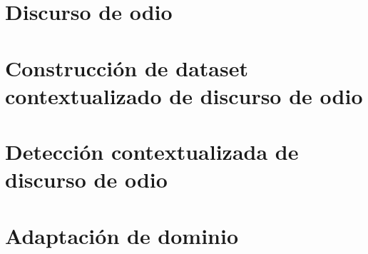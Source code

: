 
\chapter{Discurso de odio}
\label{app:04}


\chapter{Construcción de dataset contextualizado de discurso de odio}
\label{app:05}

\chapter{Detección contextualizada de discurso de odio}
\label{app:06}

\chapter{Adaptación de dominio}
\label{app:07}

